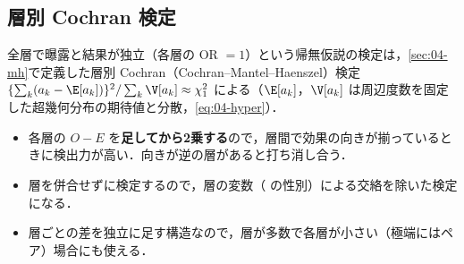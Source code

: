 \subsection{層別 Cochran 検定}\label{subsec:07-mh}
\Hissu\Hinshutsu 全層で曝露と結果が独立（各層の OR $=1$）という帰無仮説の検定は，\cref{sec:04-mh}で定義した層別 Cochran（Cochran--Mantel--Haenszel）検定
$\{\sum_k(a_k-\E[a_k])\}^2/\sum_k\V[a_k]\approx\chi^2_1$ による（$\E[a_k]$，$\V[a_k]$ は周辺度数を固定した超幾何分布の期待値と分散，\cref{eq:04-hyper}）．
\begin{itemize}
\item 各層の $O-E$ を\textbf{足してから2乗する}ので，層間で効果の向きが揃っているときに検出力が高い．向きが逆の層があると打ち消し合う．
\item 層を併合せずに検定するので，層の変数（ の性別）による交絡を除いた検定になる．
\item 層ごとの差を独立に足す構造なので，層が多数で各層が小さい（極端にはペア）場合にも使える．
\end{itemize}

